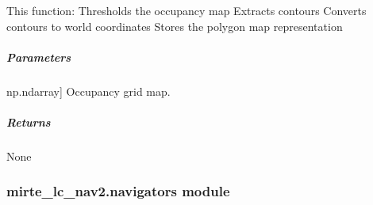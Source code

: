 \documentclass[letterpaper,10pt,english]{sphinxmanual}
\begin{document}
\begin{fulllineitems}
\begin{fulllineitems}
\sphinxAtStartPar
This function:
\sphinxhyphen{} Thresholds the occupancy map
\sphinxhyphen{} Extracts contours
\sphinxhyphen{} Converts contours to world coordinates
\sphinxhyphen{} Stores the polygon map representation


\subparagraph{Parameters}
\label{\detokenize{mirte_lc_nav2.navigator_types:id10}}\begin{description}
\sphinxlineitem{new\_map}{[}np.ndarray{]}
\sphinxAtStartPar
Occupancy grid map.

\end{description}


\subparagraph{Returns}
\label{\detokenize{mirte_lc_nav2.navigator_types:id11}}
\sphinxAtStartPar
None

\end{fulllineitems}


\begin{fulllineitems}
\label{\detokenize{mirte_lc_nav2.navigator_types:mirte_lc_nav2.navigator_types.SystematicNavigator.world_to_pixel_poly}}
\pysigstartsignatures
\pysiglinewithargsret
{}
{}
{}
\pysigstopsignatures
\end{fulllineitems}


\end{fulllineitems}


\begin{fulllineitems}
\label{\detokenize{mirte_lc_nav2.navigator_types:mirte_lc_nav2.navigator_types.polygon_area}}
\pysigstartsignatures
\pysiglinewithargsret
{}
{}
{}
\pysigstopsignatures
\end{fulllineitems}


\sphinxstepscope


\subsubsection{mirte\_lc\_nav2.navigators module}
\label{\detokenize{mirte_lc_nav2.navigators:module-mirte_lc_nav2.navigators}}\label{\detokenize{mirte_lc_nav2.navigators:mirte-lc-nav2-navigators-module}}\label{\detokenize{mirte_lc_nav2.navigators::doc}}
\end{document}
